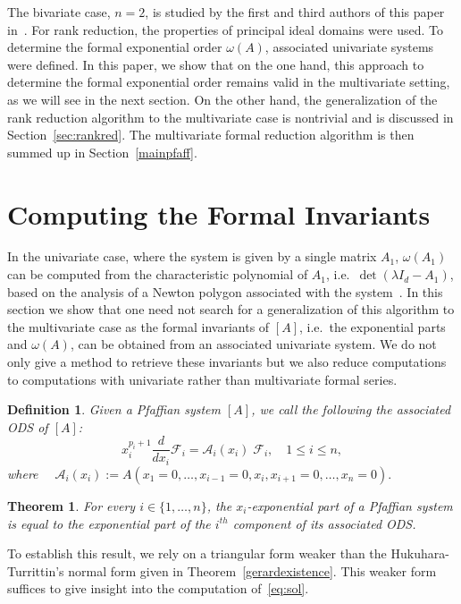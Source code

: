 \documentclass[final,1p,times,number,amsthm]{elsart}
\newtheorem{theorem}[lemma]{Theorem}
\newtheorem{definition}[lemma]{Definition}
\begin{document}
The bivariate case, $n=2$, is studied by the first and third authors of this
paper in~\cite{key101}. For rank reduction, the properties of principal ideal
domains were used. To determine the formal exponential order $\omega(A)$,
associated univariate systems were defined. In this paper, we show that on the
one hand, this approach to determine the formal exponential order remains valid
in the multivariate setting, as we will see in the next section. On the other
hand, the generalization of the rank reduction algorithm to the multivariate
case is nontrivial and is discussed in Section~\ref{sec:rankred}. The
multivariate formal reduction algorithm is then summed up in
Section~\ref{mainpfaff}.

\section{Computing the Formal Invariants}
\label{sec:invariants}
In the univariate case, where the system is given by a single matrix $A_1$,
$\omega(A_1)$ can be computed from the characteristic polynomial of $A_1$, i.e.\
$\det(\lambda I_d - A_1)$, based on the analysis of a Newton polygon associated
with the system~\cite[Theorem 1]{key24}. In this section we show that one need
not search for a generalization of this algorithm to the multivariate case as
the formal invariants of $[A]$, i.e.\ the exponential parts and $\omega(A)$, can
be obtained from an associated univariate system. We do not only give a method
to retrieve these invariants but we also reduce computations to computations
with univariate rather than multivariate formal series.
\begin{definition}
\label{defass}
Given a Pfaffian system $[A]$, we call the following the \textit{associated ODS}
of $[A]$:
  \begin{equation*}
  x_i^{p_i+1} \frac{d}{dx_i} \mathcal{F}_i =
\mathcal{A}_{i}(x_i)\;\mathcal{F}_i, \quad 1 \leq i \leq n,
  \end{equation*}
  where
  $\quad \mathcal{A}_{i}(x_i) := A (x_1=0, \dots, x_{i-1}=0, x_i, x_{i+1}=0,
  \dots, x_n=0).$
\end{definition}
\begin{theorem}
\label{exponentialpfaff}
For every $i \in \{ 1, \dots, n \}$, the $x_i$-exponential part of a
Pfaffian system is equal to the exponential part of the $i^{th}$
component of its associated ODS.
 \end{theorem}
 To establish this result, we rely on a triangular form weaker than the
 Hukuhara-Turrittin's normal form given in Theorem~\ref{gerardexistence}. This
 weaker form suffices to give insight into the computation of~\eqref{eq:sol}.
\end{document}
